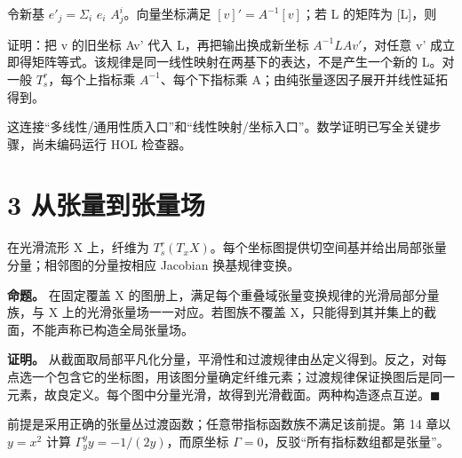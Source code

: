 \documentclass[UTF8,a4paper,zihao=-4,fontset=windows,openany]{ctexbook}
\newcommand{\mcsdisplay}[1]{%
  \par\addvspace{0.7em}%
  \sbox{\mcsmathbox}{\ensuremath{\displaystyle #1}}%
  \ifdim\wd\mcsmathbox>\linewidth
    \noindent\resizebox{\linewidth}{!}{\usebox{\mcsmathbox}}%
  \else
    \noindent\hspace*{\fill}\usebox{\mcsmathbox}\hspace*{\fill}%
  \fi
  \par\addvspace{0.7em}%
}
\def\ensuremath#1{#1}%
\def\mathrm#1{#1}%
\begin{document}
令新基 \(e'_j=\Sigma_i\) \(e_i\) \(A^i_j\)。向量坐标满足 \([v]'=A^{-1}[v]\)；若 L 的矩阵为 [L]，则


\mcsdisplay{[L]'=A^{-1}[L]A.}
\noindent 证明：把 v 的旧坐标 Av' 代入 L，再把输出换成新坐标 \(A^{-1}\mathrm{LAv}'\)，对任意 v' 成立即得矩阵等式。该规律是同一线性映射在两基下的表达，不是产生一个新的 L。对一般 \(T^r_s\)，每个上指标乘 \(A^{-1}\)、每个下指标乘 A；由纯张量逐因子展开并线性延拓得到。

这连接“多线性/通用性质入口”和“线性映射/坐标入口”。数学证明已写全关键步骤，尚未编码运行 HOL 检查器。

\section{3 从张量到张量场}
在光滑流形 X 上，纤维为 \(T^r_s(T_\mathrm{xX})\)。每个坐标图提供切空间基并给出局部张量分量；相邻图的分量按相应 Jacobian 换基规律变换。

\textbf{命题。} 在固定覆盖 X 的图册上，满足每个重叠域张量变换规律的光滑局部分量族，与 X 上的光滑张量场一一对应。若图族不覆盖 X，只能得到其并集上的截面，不能声称已构造全局张量场。

\textbf{证明。} 从截面取局部平凡化分量，平滑性和过渡规律由丛定义得到。反之，对每点选一个包含它的坐标图，用该图分量确定纤维元素；过渡规律保证换图后是同一元素，故良定义。每个图中分量光滑，故得到光滑截面。两种构造逐点互逆。\(\blacksquare\)

前提是采用正确的张量丛过渡函数；任意带指标函数族不满足该前提。第 14 章以 \(y=x^{2}\) 计算 \(\Gamma^y_\mathrm{yy}=-1/(2y)\)，而原坐标 \(\Gamma=0\)，反驳“所有指标数组都是张量”。
\end{document}
